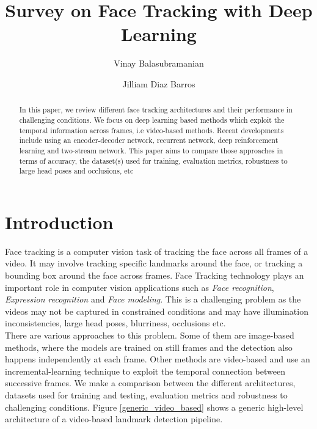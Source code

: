 \documentclass{llncs}
\begin{document}
\pagestyle{headings}  %

%
\title{Survey on Face Tracking with Deep Learning}
%
%
\author{Vinay Balasubramanian \and Jilliam Diaz Barros}
%
%

\maketitle              %

\begin{abstract}
In this paper, we review different face tracking architectures and their performance in challenging conditions. We focus on deep learning  based methods which exploit the temporal information across frames, i.e video-based methods. Recent developments include using an encoder-decoder network, recurrent network, deep reinforcement learning and two-stream network. This paper aims to compare those approaches in terms of accuracy, the dataset(s) used for training, evaluation metrics, robustness to large head poses and occlusions, etc
\end{abstract}


\section{Introduction}
Face tracking is a computer vision task of tracking the face across all frames of a video. It may involve tracking specific landmarks around the face, or tracking a bounding box around the face across frames.
Face Tracking technology plays an important role in computer vision applications such as \textit{Face recognition}\cite{face_recognition}, \textit{Expression recognition}\cite{expression_recognition} and \textit{Face modeling}\cite{face_modeling}. This is a challenging problem as the videos may not be captured in constrained conditions and may have illumination inconsistencies, large head poses, blurriness, occlusions etc.\\

There are various approaches to this problem. Some of them are image-based methods, where the models are trained on still frames and the detection also happens independently at each frame. Other methods are video-based and use an incremental-learning technique to exploit the temporal connection between successive frames. We make a comparison between the different architectures, datasets used for training and testing, evaluation metrics and robustness to challenging conditions. Figure \ref{generic_video_based} shows a generic high-level architecture of a video-based landmark detection pipeline.
\end{document}
